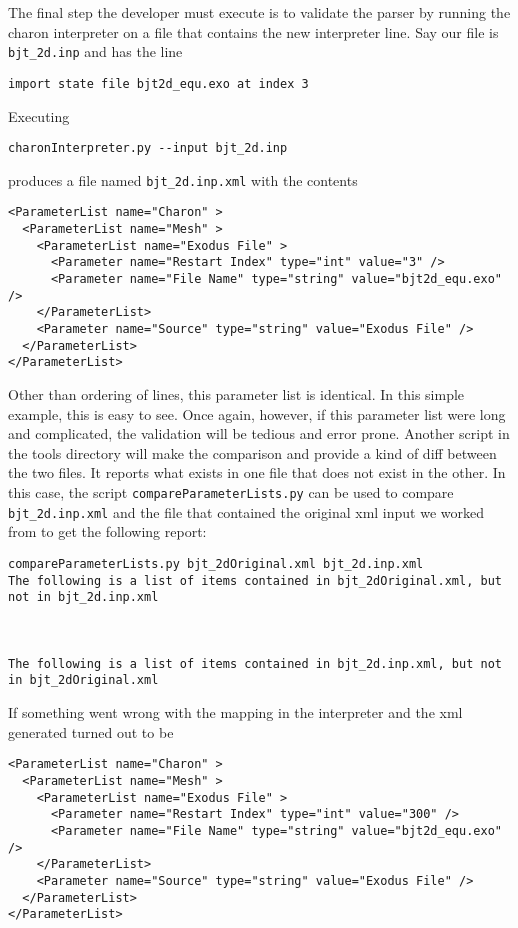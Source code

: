The final step the developer must execute is to validate the parser by
running the charon interpreter on a file that contains the new
interpreter line.  Say our file is \texttt{bjt\_2d.inp} and has the
line
\begin{lstlisting}
import state file bjt2d_equ.exo at index 3
\end{lstlisting}
Executing
\begin{lstlisting}
charonInterpreter.py --input bjt_2d.inp
\end{lstlisting}
produces a file named \texttt{bjt\_2d.inp.xml} with the contents
\begin{lstlisting}
<ParameterList name="Charon" >
  <ParameterList name="Mesh" >
    <ParameterList name="Exodus File" >
      <Parameter name="Restart Index" type="int" value="3" />
      <Parameter name="File Name" type="string" value="bjt2d_equ.exo" />
    </ParameterList>
    <Parameter name="Source" type="string" value="Exodus File" />
  </ParameterList>
</ParameterList>
\end{lstlisting}
Other than ordering of lines, this parameter list is identical.  In
this simple example, this is easy to see. Once again, however, if this
parameter list were long and complicated, the validation will be
tedious and error prone.  Another script in the tools directory will
make the comparison and provide a kind of diff between the two files.
It reports what exists in one file that does not exist in the other.
In this case, the script \texttt{compareParameterLists.py} can be used
to compare \texttt{bjt\_2d.inp.xml} and the file that contained the
original xml input we worked from to get the following report:
\begin{lstlisting}
compareParameterLists.py bjt_2dOriginal.xml bjt_2d.inp.xml
The following is a list of items contained in bjt_2dOriginal.xml, but not in bjt_2d.inp.xml



The following is a list of items contained in bjt_2d.inp.xml, but not in bjt_2dOriginal.xml

\end{lstlisting}
If something went wrong with the mapping in the interpreter and the
xml generated turned out to be
\begin{lstlisting}
<ParameterList name="Charon" >
  <ParameterList name="Mesh" >
    <ParameterList name="Exodus File" >
      <Parameter name="Restart Index" type="int" value="300" />
      <Parameter name="File Name" type="string" value="bjt2d_equ.exo" />
    </ParameterList>
    <Parameter name="Source" type="string" value="Exodus File" />
  </ParameterList>
</ParameterList>
\end{lstlisting}
